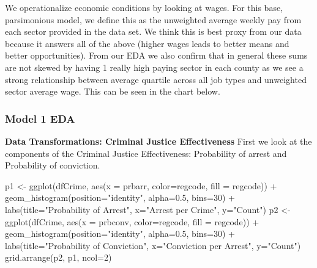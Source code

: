 \documentclass[]{article}
\newenvironment{Shaded}{}{}
\newcommand{\DataTypeTok}[1]{#1}
\newcommand{\DecValTok}[1]{#1}
\newcommand{\FloatTok}[1]{#1}
\newcommand{\KeywordTok}[1]{\textcolor[rgb]{0.00,0.00,1.00}{#1}}
\newcommand{\NormalTok}[1]{#1}
\newcommand{\OperatorTok}[1]{#1}
\newcommand{\StringTok}[1]{\textcolor[rgb]{0.00,0.50,0.50}{#1}}
\begin{document}
We operationalize economic conditions by looking at wages. For this
base, parsimonious model, we define this as the unweighted average
weekly pay from each sector provided in the data set. We think this is
best proxy from our data because it answers all of the above (higher
wages leads to better means and better opportunities). From our EDA we
also confirm that in general these sums are not skewed by having 1
really high paying sector in each county as we see a strong relationship
between average quartile across all job types and unweighted sector
average wage. This can be seen in the chart below.

\hypertarget{model-1-eda}{%
\subsubsection{Model 1 EDA}\label{model-1-eda}}

\textbf{Data Transformations: Criminal Justice Effectiveness} First we
look at the components of the Criminal Justice Effectiveness:
Probability of arrest and Probability of conviction.

\begin{Shaded}
\begin{Highlighting}[]
\NormalTok{p1 <-}\StringTok{ }\KeywordTok{ggplot}\NormalTok{(dfCrime, }\KeywordTok{aes}\NormalTok{(}\DataTypeTok{x =}\NormalTok{ prbarr, }\DataTypeTok{color=}\NormalTok{regcode, }\DataTypeTok{fill =}\NormalTok{ regcode)) }\OperatorTok{+}\StringTok{ }
\StringTok{  }\KeywordTok{geom_histogram}\NormalTok{(}\DataTypeTok{position=}\StringTok{"identity"}\NormalTok{, }\DataTypeTok{alpha=}\FloatTok{0.5}\NormalTok{, }\DataTypeTok{bins=}\DecValTok{30}\NormalTok{) }\OperatorTok{+}
\StringTok{  }\KeywordTok{labs}\NormalTok{(}\DataTypeTok{title=}\StringTok{"Probability of Arrest"}\NormalTok{, }\DataTypeTok{x=}\StringTok{"Arrest per Crime"}\NormalTok{, }\DataTypeTok{y=}\StringTok{"Count"}\NormalTok{)}
\NormalTok{p2 <-}\StringTok{ }\KeywordTok{ggplot}\NormalTok{(dfCrime, }\KeywordTok{aes}\NormalTok{(}\DataTypeTok{x =}\NormalTok{ prbconv, }\DataTypeTok{color=}\NormalTok{regcode, }\DataTypeTok{fill =}\NormalTok{ regcode)) }\OperatorTok{+}\StringTok{ }
\StringTok{  }\KeywordTok{geom_histogram}\NormalTok{(}\DataTypeTok{position=}\StringTok{"identity"}\NormalTok{, }\DataTypeTok{alpha=}\FloatTok{0.5}\NormalTok{, }\DataTypeTok{bins=}\DecValTok{30}\NormalTok{) }\OperatorTok{+}
\StringTok{  }\KeywordTok{labs}\NormalTok{(}\DataTypeTok{title=}\StringTok{"Probability of Conviction"}\NormalTok{, }\DataTypeTok{x=}\StringTok{"Conviction per Arrest"}\NormalTok{, }\DataTypeTok{y=}\StringTok{"Count"}\NormalTok{)}
\KeywordTok{grid.arrange}\NormalTok{(p2, p1, }\DataTypeTok{ncol=}\DecValTok{2}\NormalTok{)}
\end{Highlighting}
\end{Shaded}
\end{document}
